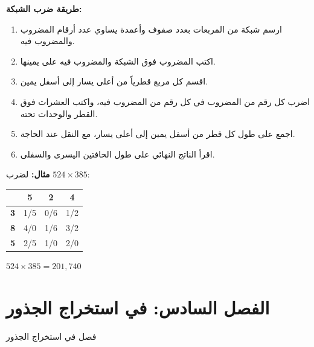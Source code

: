 \documentclass[11pt,a4paper,openany,oneside]{book}
\newcommand{\ar}[1]{{\arabicfont\beginR #1\endR}}
\newcommand{\arLarge}[1]{{\Large\arabicfont\beginR #1\endR}}
\newenvironment{arabicbox}{%
  \begin{framed}
  \begin{minipage}{\dimexpr\linewidth-2\fboxsep-2\fboxrule\relax}
  \setlength{\parindent}{0pt}
  \linespread{1.3}\selectfont
}{%
  \end{minipage}
  \end{framed}
}
\newenvironment{mathalgo}{%
  \par\vspace{0.3cm}
  \begin{framed}
  \setlength{\parindent}{0pt}
}{%
  \end{framed}
  \par\vspace{0.3cm}
}
\begin{document}
\begin{mathalgo}
\textbf{\ar{طريقة ضرب الشبكة:}}
\begin{enumerate}[nosep]
  \item \ar{ارسم شبكة من المربعات بعدد صفوف وأعمدة يساوي عدد أرقام المضروب والمضروب فيه.}
  \item \ar{اكتب المضروب فوق الشبكة والمضروب فيه على يمينها.}
  \item \ar{اقسم كل مربع قطرياً من أعلى يسار إلى أسفل يمين.}
  \item \ar{اضرب كل رقم من المضروب في كل رقم من المضروب فيه، واكتب العشرات فوق القطر والوحدات تحته.}
  \item \ar{اجمع على طول كل قطر من أسفل يمين إلى أعلى يسار، مع النقل عند الحاجة.}
  \item \ar{اقرأ الناتج النهائي على طول الحافتين اليسرى والسفلى.}
\end{enumerate}
\end{mathalgo}

\vspace{0.3cm}

\noindent\textbf{\ar{مثال:}} \ar{لضرب} $524 \times 385$:

\begin{center}
\begin{tabular}{|c|c|c|c|}
\hline
& \textbf{5} & \textbf{2} & \textbf{4} \\
\hline
\textbf{3} & \multicolumn{1}{c|}{1/5} & \multicolumn{1}{c|}{0/6} & \multicolumn{1}{c|}{1/2} \\
\hline
\textbf{8} & \multicolumn{1}{c|}{4/0} & \multicolumn{1}{c|}{1/6} & \multicolumn{1}{c|}{3/2} \\
\hline
\textbf{5} & \multicolumn{1}{c|}{2/5} & \multicolumn{1}{c|}{1/0} & \multicolumn{1}{c|}{2/0} \\
\hline
\end{tabular}
\end{center}

\noindent \ar{النتيجة:} $\boxed{524 \times 385 = 201{,}740}$

\section{\ar{الفصل السادس: في استخراج الجذور}}

\begin{arabicbox}
\begin{center}
\arLarge{فصل في استخراج الجذور}
\end{center}
\end{arabicbox}
\end{document}

